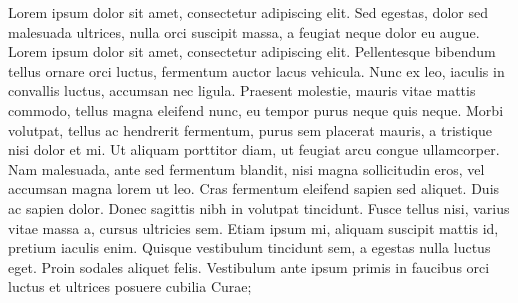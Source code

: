 \documentclass{article}
\begin{document}
        \pend
    \pausenumbering

\begin{pairs}\sloppy
\begin{Leftside}
    \resumenumbering

    \pstart
Lorem ipsum dolor sit amet, consectetur adipiscing elit. Sed egestas, dolor sed malesuada ultrices, nulla orci suscipit massa, a feugiat neque dolor eu augue. Lorem ipsum dolor sit amet, consectetur adipiscing elit. Pellentesque bibendum tellus ornare orci luctus, fermentum auctor lacus vehicula. Nunc ex leo, iaculis in convallis luctus, accumsan nec ligula. Praesent molestie, mauris vitae mattis commodo, tellus magna eleifend nunc, eu tempor purus neque quis neque. Morbi volutpat, tellus ac hendrerit fermentum, purus sem placerat mauris, a tristique nisi dolor et mi. Ut aliquam porttitor diam, ut feugiat arcu congue ullamcorper. Nam malesuada, ante sed fermentum blandit, nisi magna sollicitudin eros, vel accumsan magna lorem ut leo. Cras fermentum eleifend sapien sed aliquet. Duis ac sapien dolor. Donec sagittis nibh in volutpat tincidunt. Fusce tellus nisi, varius vitae massa a, cursus ultricies sem. Etiam ipsum mi, aliquam suscipit mattis id, pretium iaculis enim. Quisque vestibulum tincidunt sem, a egestas nulla luctus eget. Proin sodales aliquet felis. Vestibulum ante ipsum primis in faucibus orci luctus et ultrices posuere cubilia Curae;

        \pend

        \endnumbering

\end{Leftside}

\begin{Rightside}
    \resumenumbering



\end{Rightside}
\end{pairs}
\end{document}
